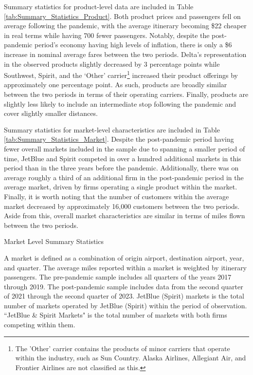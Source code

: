 \documentclass{article}
\begin{document}
    Summary statistics for product-level data are included in Table \ref{tab:Summary_Statistics_Product}. Both product prices and passengers fell on average following the pandemic, with the average itinerary becoming \$22 cheaper in real terms while having 700 fewer passengers. Notably, despite the post-pandemic period's economy having high levels of inflation, there is only a \$6 increase in nominal average fares between the two periods.  Delta's representation in the observed products slightly decreased by 3 percentage points while Southwest, Spirit, and the `Other' carrier\footnote{The 'Other' carrier contains the products of minor carriers that operate within the industry, such as Sun Country. Alaska Airlines, Allegiant Air, and Frontier Airlines are not classified as this.} increased their product offerings by approximately one percentage point. As such, products are broadly similar between the two periods in terms of their operating carriers. Finally, products are slightly less likely to include an intermediate stop following the pandemic and cover slightly smaller distances. 

    Summary statistics for market-level characteristics are included in Table \ref{tab:Summary_Statistics_Market}. Despite the post-pandemic period having fewer overall markets included in the sample due to spanning a smaller period of time, JetBlue and Spirit competed in over a hundred additional markets in this period than in the three years before the pandemic. Additionally, there was on average roughly a third of an additional firm in the post-pandemic period in the average market, driven by firms operating a single product within the market. Finally, it is worth noting that the number of customers within the average market decreased by approximately 16,000 customers between the two periods. Aside from this, overall market characteristics are similar in terms of miles flown between the two periods. 

    \begin{table}
        \caption{Market Level Summary Statistics}
        \label{tab:Summary_Statistics_Market}
                \vspace{-15mm}
\begin{center}
            
            \end{center}
    \vspace{-5mm}
            \footnotesize{A market is defined as a combination of origin airport, destination airport, year, and quarter. The average miles reported within a market is weighted by itinerary passengers. The pre-pandemic sample includes all quarters of the years 2017 through 2019. The post-pandemic sample includes data from the second quarter of 2021 through the second quarter of 2023. JetBlue (Spirit) markets is the total number of markets operated by JetBlue (Spirit) within the period of observation. ``JetBlue \& Spirit Markets" is the total number of markets with both firms competing within them.}

    \end{table}
\end{document}
